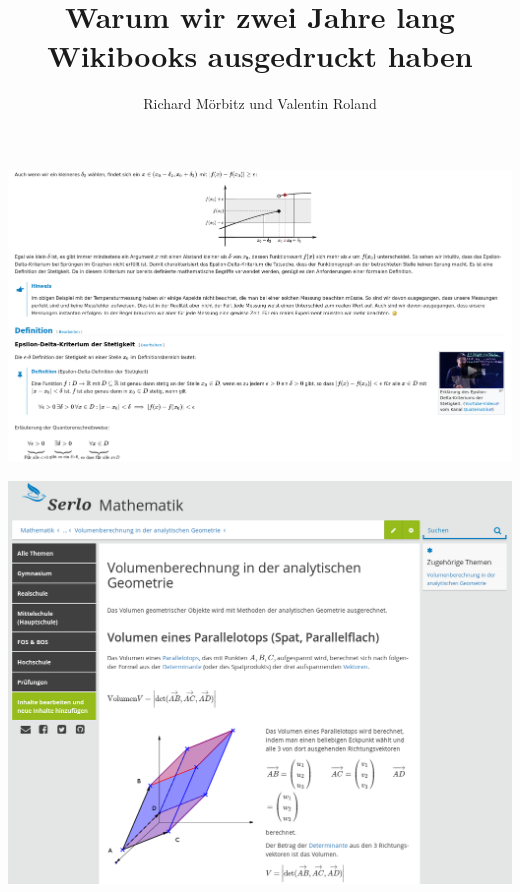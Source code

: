 \documentclass[aspectratio=169]{beamer}
\title{Warum wir zwei Jahre lang Wikibooks ausgedruckt haben}
\author{Richard Mörbitz und Valentin Roland}
\date{}
\begin{document}
\begin{frame}
    \maketitle
\end{frame}

\begin{frame}
    \centering
    \includegraphics[height=0.9\textheight]{mfnf.png}
\end{frame}

\begingroup
\begin{frame}
    \centering
    \includegraphics[height=0.9\textheight]{serlo.png}
\end{frame}
\endgroup
\end{document}

